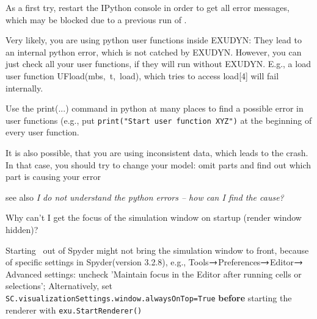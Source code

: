 	\item[$\ra$] As a first try, restart the IPython console in order to get all error messages, which may be blocked due to a previous run of \codeName.
	\item[$\ra$] Very likely, you are using python user functions inside EXUDYN: They lead to an internal python error, which is not catched by EXUDYN. However, you can just check all your user functions, if they will run without EXUDYN. E.g., a load user function UFload(mbs,~t,~load), which tries to access load[4] will fail internally.
	\item[$\ra$] Use the print(...) command in python at many places to find a possible error in user functions (e.g., put \texttt{print("Start user function XYZ")} at the beginning of every user function.
	\item[$\ra$] It is also possible, that you are using inconsistent data, which leads to the crash. In that case, you should try to change your model: omit parts and find out which part is causing your error
	\item[$\ra$] see also {\it I do not understand the python errors -- how can I find the cause?}
 	\ei


  \item Why can't I get the focus of the simulation window on startup (render window hidden)?
	\bi
	\item[$\ra$] Starting \codeName\ out of Spyder might not bring the simulation window to front, because of specific settings in Spyder(version 3.2.8), e.g., Tools$\ra$Preferences$\ra$Editor$\ra$Advanced settings: uncheck 'Maintain focus in the Editor after running cells or selections'; Alternatively, set \texttt{SC.visualizationSettings.window.alwaysOnTop=True} {\bf before} starting the renderer with \texttt{exu.StartRenderer()}
	\ei
\en


